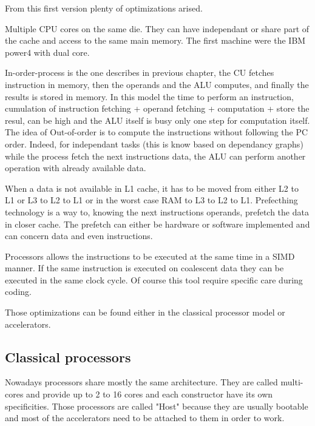 From this first version plenty of optimizations arised. 
\begin{description}
	\item[Multiple CPU cores] Multiple CPU cores on the same die. They can have independant or share part of the cache and access to the same main memory. The first machine were the IBM power4 with dual core.
	\item[In/Out-Of-Order] In-order-process is the one describes in previous chapter, the CU fetches instruction in memory, then the operands and the ALU computes, and finally the results is stored in memory. 
	In this model the time to perform an instruction, cumulation of instruction fetching + operand fetching + computation + store the resul, can be high and the ALU itself is busy only one step for computation itself. The idea of Out-of-order is to compute the instructions without following the PC order. Indeed, for independant tasks (this is know based on dependancy graphs) while the process fetch the next instructions data, the ALU can perform another operation with already available data. 
	\item[Prefetching] When a data is not available in L1 cache, it has to be moved from either L2 to L1 or L3 to L2 to L1 or in the worst case RAM to L3 to L2 to L1. Prefecthing technology is a way to, knowing the next instructions operands, prefetch the data in closer cache. The prefetch can either be hardware or software implemented and can concern data and even instructions.
	\item[Vectorization] Processors allows the instructions to be executed at the same time in a SIMD manner. If the same instruction is executed on coalescent data they can be executed in the same clock cycle. 
	Of course this tool require specific care during coding. 
\end{description}
Those optimizations can be found either in the classical processor model or accelerators.  

\subsection{Classical processors}

Nowadays processors share mostly the same architecture. 
They are called multi-cores and provide up to 2 to 16 cores and each constructor have its own specificities. 
Those processors are called "Host" because they are usually bootable and most of the accelerators need to be attached to them in order to work.

